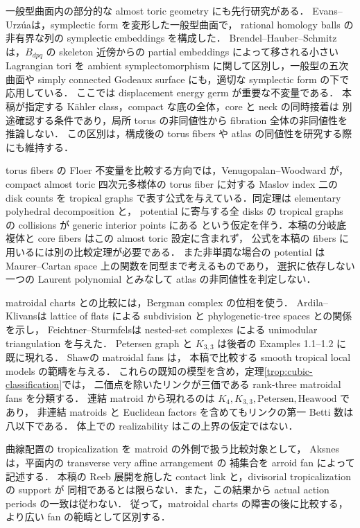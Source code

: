 一般型曲面内の部分的な almost toric geometry にも先行研究がある．
Evans--Urz\'ua\cite{EvansUrzua}は，symplectic form を変形した一般型曲面で，
rational homology balls の非有界な列の symplectic embeddings を構成した．
Brendel--Hauber--Schmitz\cite{BHS}は，$B_{dpq}$ の skeleton 近傍からの
partial embeddings によって移される小さい Lagrangian tori を
ambient symplectomorphism に関して区別し，一般型の五次曲面や
simply connected Godeaux surface にも，適切な symplectic form の下で応用している．
ここでは displacement energy germ が重要な不変量である．
本稿が指定する K\"ahler class，compact な底の全体，core と neck の同時接着は
別途確認する条件であり，局所 torus の非同値性から fibration 全体の非同値性を推論しない．
この区別は，構成後の torus fibers や atlas の同値性を研究する際にも維持する．

torus fibers の Floer 不変量を比較する方向では，Venugopalan--Woodward
\cite[Definitions~1.1--1.2, Theorem~1.3]{VenugopalanWoodward2026}が，
compact almost toric 四次元多様体の torus fiber に対する Maslov index 二の disk counts を
tropical graphs で表す公式を与えている．同定理は elementary polyhedral decomposition と，
potential に寄与する全 disks の tropical graphs の collisions が generic interior points にある
という仮定を伴う．本稿の分岐底複体と core fibers はこの almost toric 設定に含まれず，
公式を本稿の fibers に用いるには別の比較定理が必要である．
また非単調な場合の potential は Maurer--Cartan space 上の関数を同型まで考えるものであり，
選択に依存しない一つの Laurent polynomial とみなして atlas の非同値性を判定しない．

matroidal charts との比較には，Bergman complex の位相を使う．
Ardila--Klivans\cite{ArdilaKlivans}は lattice of flats による subdivision と
phylogenetic-tree spaces との関係を示し，
Feichtner--Sturmfels\cite[Theorem 4.1]{FeichtnerSturmfels}は
nested-set complexes による unimodular triangulation を与えた．
Petersen graph と $K_{3,3}$ は後者の Examples 1.1--1.2 に既に現れる．
Shaw\cite[\S2.4]{Shaw}の matroidal fans は，
本稿で比較する smooth tropical local models の範疇を与える．
これらの既知の模型を含め，定理\ref{trop:cubic-classification}では，
二価点を除いたリンクが三価である rank-three matroidal fans を分類する．
連結 matroid から現れるのは
$K_4,K_{3,3},\mathrm{Petersen},\mathrm{Heawood}$ であり，
非連結 matroids と Euclidean factors を含めてもリンクの第一 Betti 数は八以下である．
体上での realizability はこの上界の仮定ではない．

曲線配置の tropicalization を matroid の外側で扱う比較対象として，
Aksnes\cite[Theorem 4.15]{Aksnes}は，平面内の transverse very affine arrangement の
補集合を arroid fan によって記述する．
本稿の Reeb 展開を施した contact link と，divisorial tropicalization の support が
同相であるとは限らない．また，この結果から actual action periods の一致は従わない．
従って，matroidal charts の障害の後に比較する，より広い fan の範疇として区別する．

